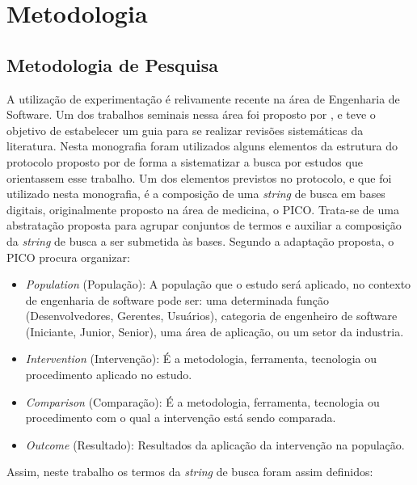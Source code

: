 \chapter{Metodologia}
\label{met}
\section{Metodologia de Pesquisa}
\label{met:pes}


A utilização de experimentação é relivamente recente na área de Engenharia de Software. Um dos trabalhos seminais nessa área foi proposto por , e teve o objetivo de estabelecer um guia para se realizar revisões sistemáticas da literatura. Nesta monografia foram utilizados alguns elementos da estrutura do protocolo proposto por  de forma a sistematizar a busca por estudos que orientassem esse trabalho. Um dos elementos previstos no protocolo, e que foi utilizado nesta monografia, é a composição de uma \textit{string} de busca em bases digitais, originalmente proposto na área de medicina, o PICO. \cite{citeulike:10757239} Trata-se de uma abstratação proposta para agrupar conjuntos de termos e auxiliar a composição da \textit{string} de busca a ser submetida às bases. Segundo a adaptação proposta, o PICO procura organizar:



\begin{itemize}
    \item \textit{Population} (População): A população que o estudo será aplicado, no contexto de engenharia de software pode ser: uma determinada função (Desenvolvedores, Gerentes, Usuários), categoria de engenheiro de software (Iniciante, Junior, Senior), uma área de aplicação, ou um setor da industria.
    \item \textit{Intervention} (Intervenção): É a metodologia, ferramenta, tecnologia ou procedimento aplicado no estudo.
    \item \textit{Comparison} (Comparação): É a metodologia, ferramenta, tecnologia ou procedimento com o qual a intervenção está sendo comparada.
    \item \textit{Outcome} (Resultado): Resultados da aplicação da intervenção na população.
\end{itemize}



Assim, neste trabalho os termos da \textit{string} de busca foram assim definidos:


